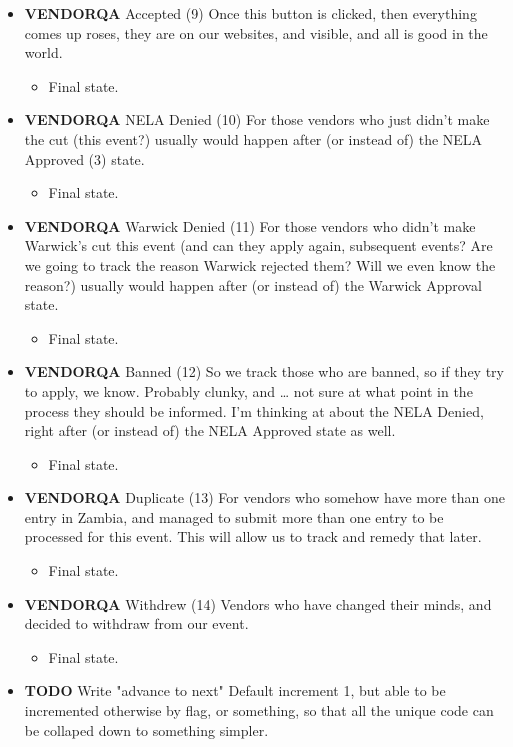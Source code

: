\documentclass[captions=tablesignature]{scrartcl}
\begin{document}
\begin{itemize}
\item {\bfseries\sffamily VENDORQA} Accepted (9)
\label{sec-3-1-5-8}
Once this button is clicked, then everything comes up roses, they
are on our websites, and visible, and all is good in the world.
\begin{itemize}
\item Final state.
\end{itemize}

\item {\bfseries\sffamily VENDORQA} NELA Denied (10)
\label{sec-3-1-5-9}
For those vendors who just didn't make the cut (this event?)
usually would happen after (or instead of) the NELA Approved (3)
state.
\begin{itemize}
\item Final state.
\end{itemize}

\item {\bfseries\sffamily VENDORQA} Warwick Denied (11)
\label{sec-3-1-5-10}
For those vendors who didn't make Warwick's cut this event (and
can they apply again, subsequent events?  Are we going to track
the reason Warwick rejected them?  Will we even know the reason?)
usually would happen after (or instead of) the Warwick Approval
state.
\begin{itemize}
\item Final state.
\end{itemize}

\item {\bfseries\sffamily VENDORQA} Banned (12)
\label{sec-3-1-5-11}
So we track those who are banned, so if they try to apply, we
know.  Probably clunky, and \ldots{} not sure at what point in the
process they should be informed.  I'm thinking at about the NELA
Denied, right after (or instead of) the NELA Approved state as
well.
\begin{itemize}
\item Final state.
\end{itemize}

\item {\bfseries\sffamily VENDORQA} Duplicate (13)
\label{sec-3-1-5-12}
For vendors who somehow have more than one entry in Zambia, and
managed to submit more than one entry to be processed for this
event.  This will allow us to track and remedy that later.
\begin{itemize}
\item Final state.
\end{itemize}

\item {\bfseries\sffamily VENDORQA} Withdrew (14)
\label{sec-3-1-5-13}
Vendors who have changed their minds, and decided to withdraw
from our event.
\begin{itemize}
\item Final state.
\end{itemize}

\item {\bfseries\sffamily TODO} Write "advance to next"
\label{sec-3-1-5-14}
Default increment 1, but able to be incremented otherwise by
flag, or something, so that all the unique code can be collaped
down to something simpler.
\end{itemize}
\end{document}
